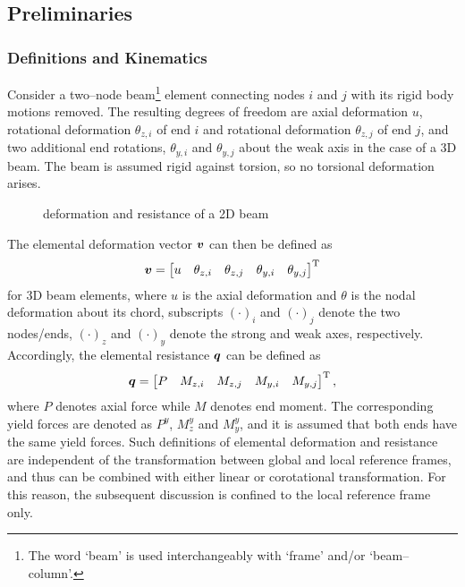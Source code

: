 \subsection{Preliminaries}
\subsubsection{Definitions and Kinematics}
Consider a two--node beam\footnote{The word `beam' is used interchangeably with `frame' and/or `beam--column'.} element connecting nodes $i$ and $j$ with its rigid body motions removed.
The resulting degrees of freedom are axial deformation $u$, rotational deformation $\theta_{z,i}$ of end $i$ and rotational deformation $\theta_{z,j}$ of end $j$, and two additional end rotations, $\theta_{y,i}$ and $\theta_{y,j}$ about the weak axis in the case of a 3D beam.
The beam is assumed rigid against torsion, so no torsional deformation arises.
\begin{figure}[H]
\centering
{}
\caption{deformation and resistance of a 2D beam}
\end{figure}

The elemental deformation vector $\bm{v}$ can then be defined as
\begin{gather}
\bm{v}=\begin{bmatrix}
u&\theta_{z,i}&\theta_{z,j}&\theta_{y,i}&\theta_{y,j}
\end{bmatrix}^{\mathrm{T}}
\end{gather}
for 3D beam elements, where $u$ is the axial deformation and $\theta$ is the nodal deformation about its chord, subscripts $\left(\cdot\right)_i$ and $\left(\cdot\right)_j$ denote the two nodes/ends, $\left(\cdot\right)_z$ and $\left(\cdot\right)_y$ denote the strong and weak axes, respectively.
Accordingly, the elemental resistance $\bm{q}$ can be defined as
\begin{gather}
\bm{q}=\begin{bmatrix}
P&M_{z,i}&M_{z,j}&M_{y,i}&M_{y,j}
\end{bmatrix}^{\mathrm{T}},
\end{gather}
where $P$ denotes axial force while $M$ denotes end moment.
The corresponding yield forces are denoted as $P^y$, $M_z^y$ and $M_y^y$, and it is assumed that both ends have the same yield forces.
Such definitions of elemental deformation and resistance are independent of the transformation between global and local reference frames, and thus can be combined with either linear or corotational transformation.
For this reason, the subsequent discussion is confined to the local reference frame only.

